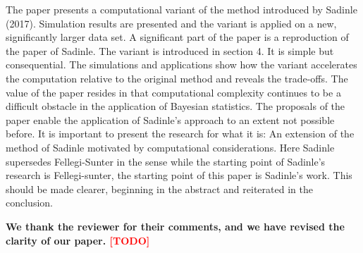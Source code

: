 \documentclass[letterpaper, parskip]{scrartcl}
\newcommand{\todo}{\textcolor{red}{[TODO]}\xspace}
\begin{document}
	The paper presents a computational variant of the method introduced by Sadinle (2017). Simulation
	results are presented and the variant is applied on a new, significantly larger data set.
	A significant part of the paper is a reproduction of the paper of Sadinle. The variant is introduced in
	section 4. It is simple but consequential. The simulations and applications show how the variant
	accelerates the computation relative to the original method and reveals the trade-offs.
	The value of the paper resides in that computational complexity continues to be a difficult obstacle in
	the application of Bayesian statistics. The proposals of the paper enable the application of Sadinle’s
	approach to an extent not possible before.
	It is important to present the research for what it is: An extension of the method of Sadinle motivated
	by computational considerations. Here Sadinle supersedes Fellegi-Sunter in the sense while the starting
	point of Sadinle’s research is Fellegi-sunter, the starting point of this paper is Sadinle’s work. This should
	be made clearer, beginning in the abstract and reiterated in the conclusion.

	\textbf{We thank the reviewer for their comments, and we have revised the clarity of our paper. \todo}
\end{document}
